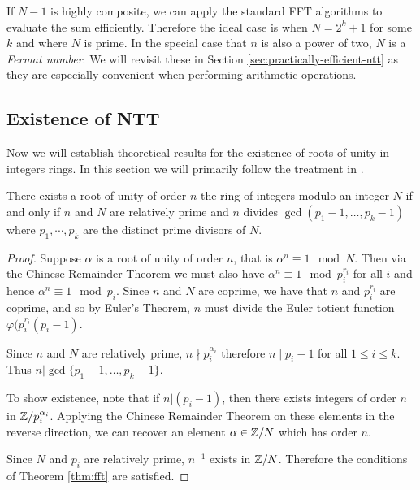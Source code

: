 If $N - 1$ is highly composite, we can apply the standard FFT algorithms to evaluate the sum efficiently. Therefore the ideal case is when $N = 2^k + 1$ for some $k$ and where $N$ is prime. In the special case that $n$ is also a power of two, $N$ is a \emph{Fermat number}. We will revisit these in Section \ref{sec:practically-efficient-ntt} as they are especially convenient when performing arithmetic operations.

\subsection{Existence of NTT}%
\label{sub:Existence of NTT}

Now we will establish theoretical results for the existence of roots of unity in integers rings.
In this section we will primarily follow the treatment in \cite{intro-to-fmt}.

\begin{theorem}\label{thm:fmt-transform-length}

    There exists a root of unity of order $n$ the ring of integers modulo an integer $N$ if and only if $n$ and $N$ are relatively prime and $n$ divides $\gcd(p_1 - 1, \ldots, p_k - 1)$ where $p_1, \cdots, p_k$ are the distinct prime divisors of $N$.
\end{theorem}

\begin{proof}
    Suppose $\alpha$ is a root of unity of order $n$, that is $\alpha^n \equiv 1 \mod N$. Then via the Chinese Remainder Theorem we must also have $\alpha^n \equiv 1 \mod p_i^{r_i}$ for all $i$ and hence $\alpha^n \equiv 1 \mod p_i$. Since $n$ and $N$ are coprime, we have that $n$ and $p_i^{r_i}$ are coprime, and so by Euler's Theorem, $n$ must divide the Euler totient function $\varphi(p_i^{r_i}(p_i - 1)$.

    Since $n$ and $N$ are relatively prime, $n \nmid p_i^{\alpha_i}$ therefore $n \mid p_i - 1$ for all $1 \le i \le k$. Thus $n | \gcd\{p_1 - 1, \ldots, p_k - 1\}$.

    \medskip

    To show existence, note that if $n | (p_i - 1)$, then there exists integers of order $n$ in ${\mathbb Z}/p_i^{\alpha_i}$. Applying the Chinese Remainder Theorem on these elements in the reverse direction, we can recover an element $\alpha \in {\mathbb Z}/N$ which has order $n$.

    \medskip

    Since $N$ and $p_i$ are relatively prime, $n^{-1}$ exists in ${\mathbb Z}/N$. Therefore the conditions of Theorem \ref{thm:fft} are satisfied.
\end{proof}

